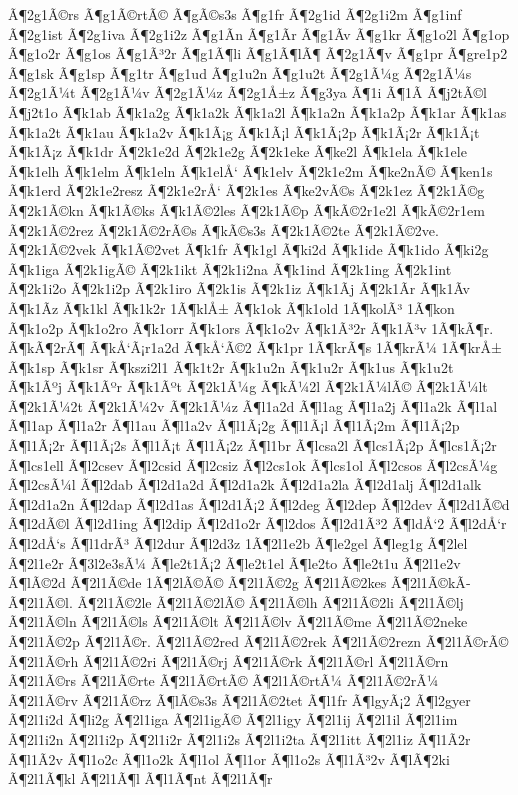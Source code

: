 {Ã¶2g1Ã©rs
Ã¶g1Ã©rtÃ©
Ã¶gÃ©s3s
Ã¶g1fr
Ã¶2g1id
Ã¶2g1i2m
Ã¶g1inf
Ã¶2g1ist
Ã¶2g1iva
Ã¶2g1i2z
Ã¶g1Ã­n
Ã¶g1Ã­r
Ã¶g1Ã­v
Ã¶g1kr
Ã¶g1o2l
Ã¶g1op
Ã¶g1o2r
Ã¶g1os
Ã¶g1Ã³2r
Ã¶g1Ã¶li
Ã¶g1Ã¶lÃ¶
Ã¶2g1Ã¶v
Ã¶g1pr
Ã¶gre1p2
Ã¶g1sk
Ã¶g1sp
Ã¶g1tr
Ã¶g1ud
Ã¶g1u2n
Ã¶g1u2t
Ã¶2g1Ã¼g
Ã¶2g1Ã¼s
Ã¶2g1Ã¼t
Ã¶2g1Ã¼v
Ã¶2g1Ã¼z
Ã¶2g1Å±z
Ã¶g3ya
Ã¶1i
Ã¶1Ã­
Ã¶j2tÃ©l
Ã¶j2t1o
Ã¶k1ab
Ã¶k1a2g
Ã¶k1a2k
Ã¶k1a2l
Ã¶k1a2n
Ã¶k1a2p
Ã¶k1ar
Ã¶k1as
Ã¶k1a2t
Ã¶k1au
Ã¶k1a2v
Ã¶k1Ã¡g
Ã¶k1Ã¡l
Ã¶k1Ã¡2p
Ã¶k1Ã¡2r
Ã¶k1Ã¡t
Ã¶k1Ã¡z
Ã¶k1dr
Ã¶2k1e2d
Ã¶2k1e2g
Ã¶2k1eke
Ã¶ke2l
Ã¶k1ela
Ã¶k1ele
Ã¶k1elh
Ã¶k1elm
Ã¶k1eln
Ã¶k1elÅ‘
Ã¶k1elv
Ã¶2k1e2m
Ã¶ke2nÃ©
Ã¶ken1s
Ã¶k1erd
Ã¶2k1e2resz
Ã¶2k1e2rÅ‘
Ã¶2k1es
Ã¶ke2vÃ©s
Ã¶2k1ez
Ã¶2k1Ã©g
Ã¶2k1Ã©kn
Ã¶k1Ã©ks
Ã¶k1Ã©2les
Ã¶2k1Ã©p
Ã¶kÃ©2r1e2l
Ã¶kÃ©2r1em
Ã¶2k1Ã©2rez
Ã¶2k1Ã©2rÃ©s
Ã¶kÃ©s3s
Ã¶2k1Ã©2te
Ã¶2k1Ã©2ve.
Ã¶2k1Ã©2vek
Ã¶k1Ã©2vet
Ã¶k1fr
Ã¶k1gl
Ã¶ki2d
Ã¶k1ide
Ã¶k1ido
Ã¶ki2g
Ã¶k1iga
Ã¶2k1igÃ©
Ã¶2k1ikt
Ã¶2k1i2na
Ã¶k1ind
Ã¶2k1ing
Ã¶2k1int
Ã¶2k1i2o
Ã¶2k1i2p
Ã¶2k1iro
Ã¶2k1is
Ã¶2k1iz
Ã¶k1Ã­j
Ã¶2k1Ã­r
Ã¶k1Ã­v
Ã¶k1Ã­z
Ã¶k1kl
Ã¶k1k2r
1Ã¶klÅ±
Ã¶k1ok
Ã¶k1old
1Ã¶kolÃ³
1Ã¶kon
Ã¶k1o2p
Ã¶k1o2ro
Ã¶k1orr
Ã¶k1ors
Ã¶k1o2v
Ã¶k1Ã³2r
Ã¶k1Ã³v
1Ã¶kÃ¶r.
Ã¶kÃ¶2rÃ¶
Ã¶kÅ‘Ã¡r1a2d
Ã¶kÅ‘Ã©2
Ã¶k1pr
1Ã¶krÃ¶s
1Ã¶krÃ¼
1Ã¶krÅ±
Ã¶k1sp
Ã¶k1sr
Ã¶kszi2l1
Ã¶k1t2r
Ã¶k1u2n
Ã¶k1u2r
Ã¶k1us
Ã¶k1u2t
Ã¶k1Ãºj
Ã¶k1Ãºr
Ã¶k1Ãºt
Ã¶2k1Ã¼g
Ã¶kÃ¼2l
Ã¶2k1Ã¼lÃ©
Ã¶2k1Ã¼lt
Ã¶2k1Ã¼2t
Ã¶2k1Ã¼2v
Ã¶2k1Ã¼z
Ã¶l1a2d
Ã¶l1ag
Ã¶l1a2j
Ã¶l1a2k
Ã¶l1al
Ã¶l1ap
Ã¶l1a2r
Ã¶l1au
Ã¶l1a2v
Ã¶l1Ã¡2g
Ã¶l1Ã¡l
Ã¶l1Ã¡2m
Ã¶l1Ã¡2p
Ã¶l1Ã¡2r
Ã¶l1Ã¡2s
Ã¶l1Ã¡t
Ã¶l1Ã¡2z
Ã¶l1br
Ã¶lcsa2l
Ã¶lcs1Ã¡2p
Ã¶lcs1Ã¡2r
Ã¶lcs1ell
Ã¶l2csev
Ã¶l2csid
Ã¶l2csiz
Ã¶l2cs1ok
Ã¶lcs1ol
Ã¶l2csos
Ã¶l2csÃ¼g
Ã¶l2csÃ¼l
Ã¶l2dab
Ã¶l2d1a2d
Ã¶l2d1a2k
Ã¶l2d1a2la
Ã¶l2d1alj
Ã¶l2d1alk
Ã¶l2d1a2n
Ã¶l2dap
Ã¶l2d1as
Ã¶l2d1Ã¡2
Ã¶l2deg
Ã¶l2dep
Ã¶l2dev
Ã¶l2d1Ã©d
Ã¶l2dÃ©l
Ã¶l2d1ing
Ã¶l2dip
Ã¶l2d1o2r
Ã¶l2dos
Ã¶l2d1Ã³2
Ã¶ldÅ‘2
Ã¶l2dÅ‘r
Ã¶l2dÅ‘s
Ã¶l1drÃ³
Ã¶l2dur
Ã¶l2d3z
1Ã¶2l1e2b
Ã¶le2gel
Ã¶leg1g
Ã¶2lel
Ã¶2l1e2r
Ã¶3l2e3sÃ¼
Ã¶le2t1Ã¡2
Ã¶le2t1el
Ã¶le2to
Ã¶le2t1u
Ã¶2l1e2v
Ã¶lÃ©2d
Ã¶2l1Ã©de
1Ã¶2lÃ©Ã©
Ã¶2l1Ã©2g
Ã¶2l1Ã©2kes
Ã¶2l1Ã©kÃ­
Ã¶2l1Ã©l.
Ã¶2l1Ã©2le
Ã¶2l1Ã©2lÃ©
Ã¶2l1Ã©lh
Ã¶2l1Ã©2li
Ã¶2l1Ã©lj
Ã¶2l1Ã©ln
Ã¶2l1Ã©ls
Ã¶2l1Ã©lt
Ã¶2l1Ã©lv
Ã¶2l1Ã©me
Ã¶2l1Ã©2neke
Ã¶2l1Ã©2p
Ã¶2l1Ã©r.
Ã¶2l1Ã©2red
Ã¶2l1Ã©2rek
Ã¶2l1Ã©2rezn
Ã¶2l1Ã©rÃ©
Ã¶2l1Ã©rh
Ã¶2l1Ã©2ri
Ã¶2l1Ã©rj
Ã¶2l1Ã©rk
Ã¶2l1Ã©rl
Ã¶2l1Ã©rn
Ã¶2l1Ã©rs
Ã¶2l1Ã©rte
Ã¶2l1Ã©rtÃ©
Ã¶2l1Ã©rtÃ¼
Ã¶2l1Ã©2rÃ¼
Ã¶2l1Ã©rv
Ã¶2l1Ã©rz
Ã¶lÃ©s3s
Ã¶2l1Ã©2tet
Ã¶l1fr
Ã¶lgyÃ¡2
Ã¶l2gyer
Ã¶2l1i2d
Ã¶li2g
Ã¶2l1iga
Ã¶2l1igÃ©
Ã¶2l1igy
Ã¶2l1ij
Ã¶2l1il
Ã¶2l1im
Ã¶2l1i2n
Ã¶2l1i2p
Ã¶2l1i2r
Ã¶2l1i2s
Ã¶2l1i2ta
Ã¶2l1itt
Ã¶2l1iz
Ã¶l1Ã­2r
Ã¶l1Ã­2v
Ã¶l1o2c
Ã¶l1o2k
Ã¶l1ol
Ã¶l1or
Ã¶l1o2s
Ã¶l1Ã³2v
Ã¶lÃ¶2ki
Ã¶2l1Ã¶kl
Ã¶2l1Ã¶l
Ã¶l1Ã¶nt
Ã¶2l1Ã¶r
}
